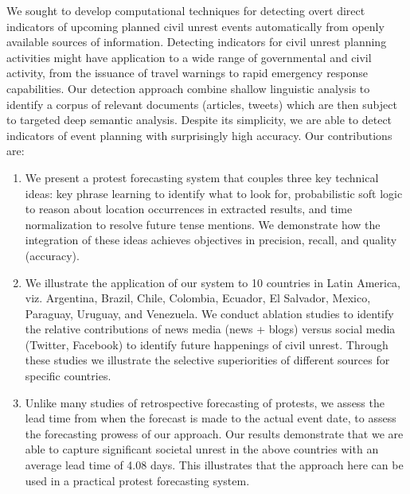 We sought to develop
computational techniques for detecting overt direct indicators
of upcoming planned civil unrest events automatically from openly
available sources of information.  Detecting indicators for civil
unrest planning activities might have application to a wide range of
governmental and civil activity, from the issuance of travel warnings
to rapid emergency response capabilities.  
Our detection approach 
combine shallow linguistic analysis to identify a corpus of relevant
documents (articles, tweets) which are then subject to targeted deep semantic analysis.
Despite its simplicity, we are able to
detect indicators of event planning with surprisingly high
accuracy. 
Our contributions are:
\begin{enumerate}
\item We present a protest forecasting system that couples three key technical ideas:
key phrase learning to identify what to look for, probabilistic soft logic to reason about location occurrences in extracted results, and 
time normalization to resolve future tense mentions. We demonstrate how the integration of these ideas achieves objectives in precision,
recall, and quality (accuracy).
\item We illustrate the application of our system to 10 countries in Latin America, viz. Argentina, Brazil, Chile, Colombia, Ecuador, El Salvador, Mexico, Paraguay, Uruguay, and Venezuela. 
We conduct ablation studies to identify the 
relative contributions of news media (news + blogs) versus social media (Twitter, Facebook) to identify future happenings of
civil unrest. Through these studies we illustrate the selective superiorities of different sources for specific countries.
\item Unlike many studies of retrospective forecasting of protests,
we assess the lead time from when the forecast is made to
the actual event date, to assess the forecasting prowess of our approach. 
Our results demonstrate that we are able to 
capture significant societal unrest in the above countries with an average lead time of 4.08 days. This illustrates that the
approach here can be used in a practical protest forecasting system.
\end{enumerate}

